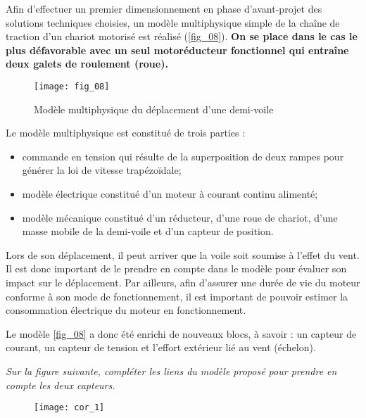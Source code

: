 Afin d’effectuer un premier dimensionnement en phase d’avant-projet des solutions
techniques choisies, un modèle multiphysique simple de la chaîne de traction d’un chariot motorisé est réalisé
(\autoref{fig_08}).
\textbf{On se place dans le cas le plus défavorable avec un seul motoréducteur fonctionnel qui entraîne
deux galets de roulement (roue).}


\begin{figure}[H]
\centering
\texttt{[image: fig\_08]}
\caption{Modèle multiphysique du déplacement d’une demi-voile \label{fig_08}}
\end{figure}

Le modèle multiphysique est constitué de trois parties :
\begin{itemize}
\item commande en tension qui résulte de la superposition de deux rampes pour générer la loi de vitesse trapézoïdale;
\item modèle électrique constitué d’un moteur à courant continu alimenté;%
\item modèle mécanique constitué d’un réducteur, d’une roue de chariot, d’une masse mobile de la demi-voile et
d’un capteur de position.
\end{itemize}


%

Lors de son déplacement, il peut arriver que la voile soit soumise à l’effet du vent. Il est donc important de
le prendre en compte dans le modèle pour évaluer son impact sur le déplacement. Par ailleurs, afin d’assurer
une durée de vie du moteur conforme à son mode de fonctionnement, il est important de pouvoir estimer la
consommation électrique du moteur en fonctionnement.

Le modèle \autoref{fig_08} a donc été enrichi de nouveaux blocs, à savoir : un capteur de courant, un capteur de tension
et l’effort extérieur lié au vent (échelon).
\fi


\question{\label{q5}}\textit{Sur la figure suivante, compléter les liens du modèle proposé pour prendre en compte
les deux capteurs.}
\ifprof
\begin{corrige}
\begin{figure}[H]
\centering
\texttt{[image: cor\_1]}
\end{figure}
\end{corrige}
\else
\fi

